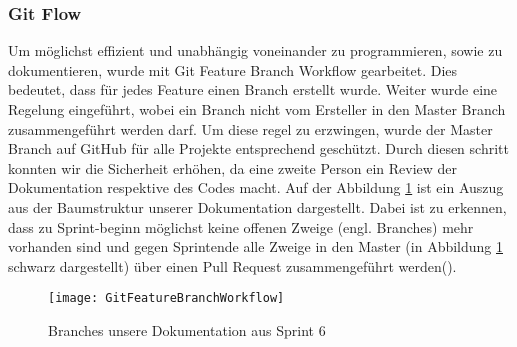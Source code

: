 \subsubsection{Git Flow}
Um möglichst effizient und unabhängig voneinander zu programmieren, sowie zu dokumentieren, wurde mit Git Feature Branch Workflow gearbeitet. Dies bedeutet, dass für jedes Feature einen Branch erstellt wurde. Weiter wurde eine Regelung eingeführt, wobei ein Branch nicht vom Ersteller in den Master Branch zusammengeführt werden darf. Um diese regel zu erzwingen, wurde der Master Branch auf GitHub für alle Projekte entsprechend geschützt. Durch diesen schritt konnten wir die Sicherheit erhöhen, da eine zweite Person ein Review der Dokumentation respektive des Codes macht.
Auf der Abbildung \ref{fig:FeatureBranchWorkflow} ist ein Auszug aus der Baumstruktur unserer Dokumentation dargestellt. Dabei ist zu erkennen, dass zu Sprint-beginn möglichst keine offenen Zweige (engl. Branches) mehr vorhanden sind und gegen Sprintende alle Zweige in den Master (in Abbildung \ref{fig:FeatureBranchWorkflow} schwarz dargestellt) über einen Pull Request zusammengeführt werden(\cite{BaumannWicki2018}).

\begin{figure}[htb]
	\center
	\texttt{[image: GitFeatureBranchWorkflow]}
	\caption{Branches unsere Dokumentation aus Sprint 6}
	\label{fig:FeatureBranchWorkflow}
\end{figure}

